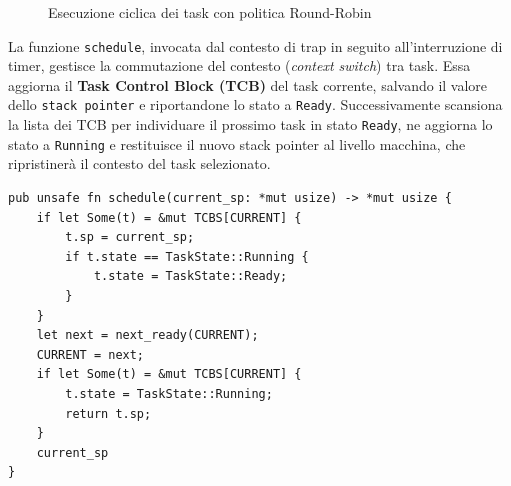 \documentclass[italian, Lau, oneside]{sapthesis} %
\begin{document}
\begin{figure}[H]
\centering
{}
\caption{Esecuzione ciclica dei task con politica Round-Robin}
\end{figure}

La funzione \texttt{schedule}, invocata dal contesto di trap in seguito all’interruzione di timer, gestisce la commutazione del contesto (\emph{context switch}) tra task.  
Essa aggiorna il \textbf{Task Control Block (TCB)} del task corrente, salvando il valore dello \texttt{stack pointer} e riportandone lo stato a \texttt{Ready}.  
Successivamente scansiona la lista dei TCB per individuare il prossimo task in stato \texttt{Ready}, ne aggiorna lo stato a \texttt{Running} e restituisce il nuovo stack pointer al livello macchina, che ripristinerà il contesto del task selezionato.

\begin{center}
\begin{verbatim}
pub unsafe fn schedule(current_sp: *mut usize) -> *mut usize {
    if let Some(t) = &mut TCBS[CURRENT] {
        t.sp = current_sp;
        if t.state == TaskState::Running {
            t.state = TaskState::Ready;
        }
    }
    let next = next_ready(CURRENT);
    CURRENT = next;
    if let Some(t) = &mut TCBS[CURRENT] {
        t.state = TaskState::Running;
        return t.sp;
    }
    current_sp
}
\end{verbatim}
\end{center}
\end{document}

